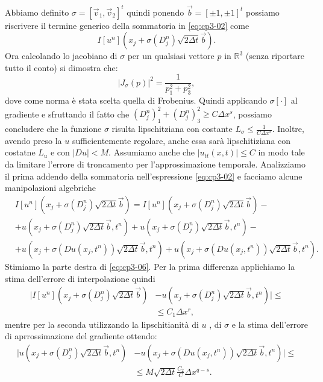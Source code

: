 Abbiamo definito $\sigma=[\vec{v}_1,\vec{v}_2]^t$ quindi ponendo  $\vec{b}=[\pm1,\pm1]^t$ possiamo riscrivere il termine generico della sommatoria in \eqref{eq:cp3-02} come
\[
I[u^n](x_j+\sigma(D_j^n)\sqrt{2\Delta t}\vec{b}).
\]
Ora calcolando lo jacobiano di $\sigma$ per un qualsiasi vettore $p$ in $\mathbb{R}^3$ (senza riportare tutto il conto) si dimostra che:
\[
\left|J_{\sigma}(p)\right|^2=\frac{1}{p_1^2+p_3^2},
\]
dove come norma è stata scelta quella di Frobenius. Quindi applicando $\sigma[\cdot]$ al gradiente e sfruttando il fatto che $(D_j^n)_1^2+(D_j^n)_3^2\ge C\Delta x^s$, possiamo concludere che la funzione $\sigma$ risulta lipschitziana con costante $L_{\sigma}\le\frac{1}{C\Delta x^s}$.
Inoltre, avendo preso la $u$ sufficientemente regolare, anche essa sarà lipschitiziana con costatne $L_u$ e con $|Du|< M$. Assumiamo anche che $|u_{tt}(x,t)|\le C$ in modo tale da limitare l'errore di troncamento per l'approssimazione temporale.
 Analizziamo il prima addendo della sommatoria nell'espressione \eqref{eq:cp3-02} e facciamo alcune manipolazioni algebriche
\begin{equation}
\label{eq:cp3-06}
\begin{split}
& I[u^n](x_j+\sigma(D_j^n)\sqrt{2\Delta t}\vec{b}) = I[u^n](x_j+\sigma(D_j^n)\sqrt{2\Delta t}\vec{b}) - \\
& +u(x_j+\sigma(D_j^n)\sqrt{2\Delta t}\vec{b},t^n) + u(x_j+\sigma(D_j^n)\sqrt{2\Delta t}\vec{b},t^n)- \\
& + u(x_j+\sigma(Du(x_j,t^n))\sqrt{2\Delta t}\vec{b},t^n)+ u(x_j+\sigma(Du(x_j,t^n))\sqrt{2\Delta t}\vec{b},t^n).
\end{split}
\end{equation}
Stimiamo la parte destra di \eqref{eq:cp3-06}. Per la prima differenza applichiamo la stima dell'errore di interpolazione quindi
\begin{equation}
  \label{eq:cp3-07}
  \begin{split}
    |I[u^n](x_j+\sigma(D_j^n)\sqrt{2\Delta t}\vec{b}) &- u(x_j+\sigma(D_j^n)\sqrt{2\Delta t}\vec{b},t^n)|\le \\
    & \le C_1\Delta x^r,
\end{split}
\end{equation}
mentre per la seconda utilizzando la lipschitianità di $u$ , di $\sigma$ e la stima dell'errore di aprrossimazione del gradiente ottendo:
\begin{equation}
  \label{eq:cp3-08}
  \begin{split}
    |u(x_j+\sigma(D_j^n)\sqrt{2\Delta t}\vec{b},t^n) &- u(x_j+\sigma(Du(x_j,t^n))\sqrt{2\Delta t}\vec{b},t^n)|\le \\
    & \le M\sqrt{2\Delta t}\frac{C_2}{C}\Delta x^{q-s}.
  \end{split}
\end{equation}
